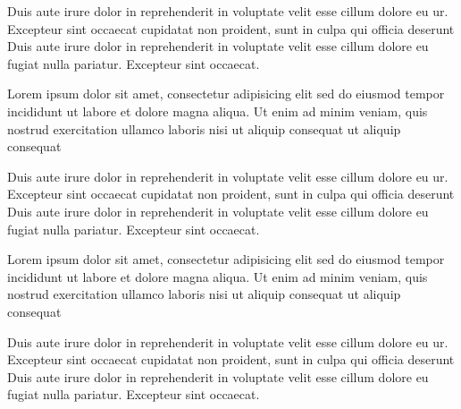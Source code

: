 \documentclass{article}
\begin{document}
\begin{pages}
\begin{Leftside}
Duis aute irure dolor in reprehenderit
in voluptate velit esse cillum dolore eu ur. Excepteur sint occaecat
cupidatat non proident, sunt in culpa qui officia deserunt
Duis aute irure dolor in reprehenderit
in voluptate velit esse cillum dolore eu fugiat nulla
pariatur. Excepteur sint occaecat.
\pend

Lorem ipsum dolor sit amet, consectetur adipisicing elit
sed do eiusmod tempor incididunt ut labore et dolore
magna aliqua. Ut enim ad minim veniam, quis nostrud
exercitation ullamco laboris nisi
ut aliquip consequat ut aliquip consequat\pend

Duis aute  irure dolor in reprehenderit
in voluptate velit esse cillum dolore eu ur. Excepteur sint occaecat
cupidatat non proident, sunt in culpa qui officia deserunt
Duis aute irure dolor in reprehenderit
in voluptate velit esse cillum dolore eu fugiat nulla
pariatur. Excepteur sint occaecat.
\pend

Lorem ipsum dolor sit amet, consectetur adipisicing elit
sed do eiusmod tempor incididunt ut labore et dolore
magna aliqua. Ut enim ad minim veniam, quis nostrud
exercitation ullamco laboris nisi
ut aliquip consequat ut aliquip consequat
\pend

Duis aute irure dolor in reprehenderit
in voluptate velit esse cillum dolore eu ur. Excepteur sint occaecat
cupidatat non proident, sunt in culpa qui officia deserunt
Duis aute irure dolor in reprehenderit
in voluptate velit esse cillum dolore eu fugiat nulla
pariatur. Excepteur sint occaecat.
\pend


\end{Leftside}
\end{pages}
\end{document}
